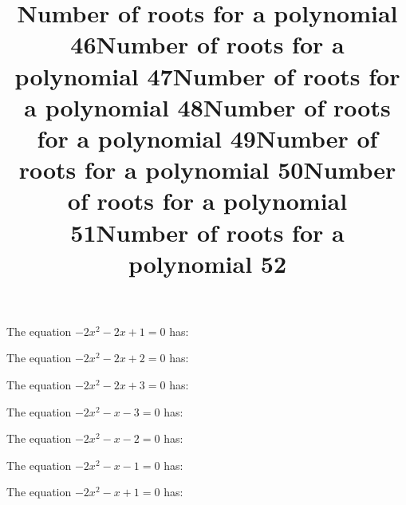 \documentclass{article}
\begin{document}
\begin{category}
\begin{question}[multichoice]
\end{question}
\begin{question}[multichoice]
\title{Number of roots for a polynomial 46}
The equation $- 2 x^{2} - 2 x + 1=0$ has:


\end{question}
\begin{question}[multichoice]
\title{Number of roots for a polynomial 47}
The equation $- 2 x^{2} - 2 x + 2=0$ has:


\end{question}
\begin{question}[multichoice]
\title{Number of roots for a polynomial 48}
The equation $- 2 x^{2} - 2 x + 3=0$ has:


\end{question}
\begin{question}[multichoice]
\title{Number of roots for a polynomial 49}
The equation $- 2 x^{2} - x - 3=0$ has:


\end{question}
\begin{question}[multichoice]
\title{Number of roots for a polynomial 50}
The equation $- 2 x^{2} - x - 2=0$ has:


\end{question}
\begin{question}[multichoice]
\title{Number of roots for a polynomial 51}
The equation $- 2 x^{2} - x - 1=0$ has:


\end{question}
\begin{question}[multichoice]
\title{Number of roots for a polynomial 52}
The equation $- 2 x^{2} - x + 1=0$ has:


\end{question}
\end{category}
\end{document}
